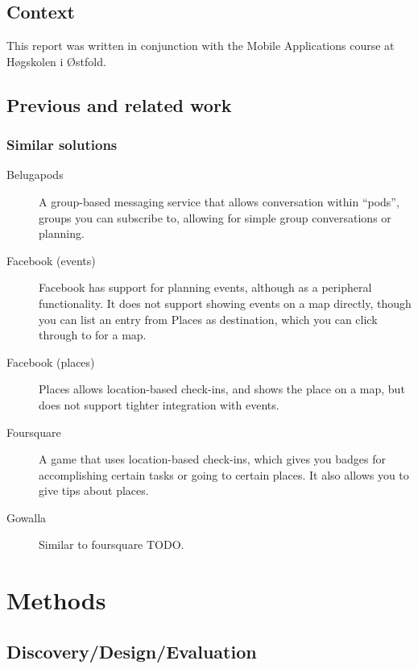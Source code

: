 \documentclass[]{report}
\begin{document}
\section{Context}

This report was written in conjunction with the Mobile Applications course at
H\o{}gskolen i \O{}stfold\cite{site:mobapp}.

\section{Previous and related work}

\subsection{Similar solutions}


\begin{description}
\item[Belugapods] A group-based messaging service that allows conversation
  within ``pods'', groups you can subscribe to, allowing for simple group
  conversations or planning.\cite{site:belugapods}
\item[Facebook (events)] Facebook has support for planning events, although as a
  peripheral functionality. It does not support showing events on a map
  directly, though you can list an entry from Places as destination, which you
  can click through to for a map.\cite{site:facebook}
\item[Facebook (places)] Places allows location-based check-ins, and shows the
  place on a map, but does not support tighter integration with events.\cite{site:facebook}
\item[Foursquare] A game that uses location-based check-ins, which gives you
  badges for accomplishing certain tasks or going to certain places. It also
  allows you to give tips about places.\cite{site:foursquare}
\item[Gowalla] Similar to foursquare TODO.\cite{site:gowalla}
\end{description}

\chapter{Methods}

\section{Discovery/Design/Evaluation}
\end{document}
